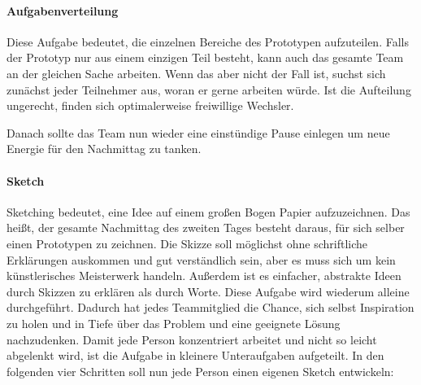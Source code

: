 \paragraph{Aufgabenverteilung}
Diese Aufgabe bedeutet, die einzelnen Bereiche des Prototypen aufzuteilen. Falls der Prototyp nur aus einem einzigen Teil besteht, kann auch das gesamte Team an der gleichen Sache arbeiten. Wenn das aber nicht der Fall ist, suchst sich zunächst jeder Teilnehmer aus, woran er gerne arbeiten würde. Ist die Aufteilung ungerecht, finden sich optimalerweise freiwillige Wechsler.

Danach sollte das Team nun wieder eine einstündige Pause einlegen um neue Energie für den Nachmittag zu tanken.

\paragraph{Sketch}
Sketching bedeutet, eine Idee auf einem großen Bogen Papier aufzuzeichnen. Das heißt, der gesamte Nachmittag des zweiten Tages besteht daraus, für sich selber einen Prototypen zu zeichnen. Die Skizze soll möglichst ohne schriftliche Erklärungen auskommen und gut verständlich sein, aber es muss sich um kein künstlerisches Meisterwerk handeln. Außerdem ist es einfacher, abstrakte Ideen durch Skizzen zu erklären als durch Worte. Diese Aufgabe wird wiederum alleine durchgeführt. Dadurch hat jedes Teammitglied die Chance, sich selbst Inspiration zu holen und in Tiefe über das Problem und eine geeignete Lösung nachzudenken. Damit jede Person konzentriert arbeitet und nicht so leicht abgelenkt wird, ist die Aufgabe in kleinere Unteraufgaben aufgeteilt. In den folgenden vier Schritten soll nun jede Person einen eigenen Sketch entwickeln:
